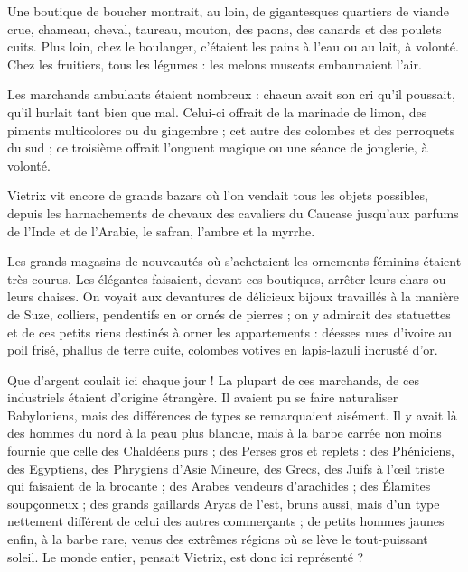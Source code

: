 \documentclass[a4paper, 11pt, oneside, polutonikogreek, french]{article}
\begin{document}
Une boutique de boucher montrait, au loin, de gigantesques quartiers de viande crue, chameau, cheval, taureau, mouton, des paons, des canards et des poulets cuits. Plus loin, chez le boulanger, c'étaient les pains à l'eau ou au lait, à volonté. Chez les fruitiers, tous les légumes : les melons muscats embaumaient l'air.

Les marchands ambulants étaient nombreux : chacun avait son cri qu'il poussait, qu'il hurlait tant bien que mal. Celui-ci offrait de la marinade de limon, des piments multicolores ou du gingembre ; cet autre des colombes et des perroquets du sud ; ce troisième offrait l'onguent magique ou une séance de jonglerie, à volonté.

Vietrix vit encore de grands bazars où l'on vendait tous les objets possibles, depuis les harnachements de chevaux des cavaliers du Caucase jusqu'aux parfums de l'Inde et de l'Arabie, le safran, l'ambre et la myrrhe.

Les grands magasins de nouveautés où s'achetaient les ornements féminins étaient très courus. Les élégantes faisaient, devant ces boutiques, arrêter leurs chars ou leurs chaises. On voyait aux devantures de délicieux bijoux travaillés à la manière de Suze, colliers, pendentifs en or ornés de pierres ; on y admirait des statuettes et de ces petits riens destinés à orner les appartements : déesses nues d'ivoire au poil frisé, phallus de terre cuite, colombes votives en lapis-lazuli incrusté d'or.

\bigskip
\centerline{\EightStarTaper}
\centerline{\EightStarTaper\EightStarTaper}
\bigskip

Que d'argent coulait ici chaque jour ! La plupart de ces marchands, de ces industriels étaient d'origine étrangère. Il avaient pu se faire naturaliser Babyloniens, mais des différences de types se remarquaient aisément. Il y avait là des hommes du nord à la peau plus blanche, mais à la barbe carrée non moins fournie que celle des Chaldéens purs ; des Perses gros et replets : des Phéniciens, des Egyptiens, des Phrygiens d'Asie Mineure, des Grecs, des Juifs à l'œil triste qui faisaient de la brocante ; des Arabes vendeurs d'arachides ; des Élamites soupçonneux ; des grands gaillards Aryas de l'est, bruns aussi, mais d'un type nettement différent de celui des autres commerçants ; de petits hommes jaunes enfin, à la barbe rare, venus des extrêmes régions où se lève le tout-puissant soleil. Le monde entier, pensait Vietrix, est donc ici représenté ?

\bigskip
\centerline{\EightStarTaper}
\centerline{\EightStarTaper\EightStarTaper}
\bigskip
\end{document}
